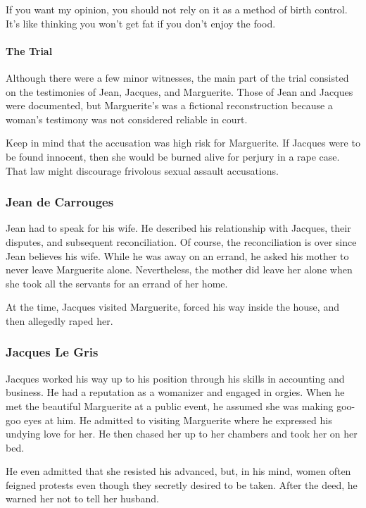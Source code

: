 If you want my opinion, you should not rely on it as a method of birth control. It's like thinking you won't get fat if you don't enjoy the food.

\paragraph{The Trial}


Although there were a few minor witnesses, the main part of the trial consisted on the testimonies of Jean, Jacques, and Marguerite. Those of Jean and Jacques were documented, but Marguerite's was a fictional reconstruction because a woman's testimony was not considered reliable in court.

Keep in mind that the accusation was high risk for Marguerite. If Jacques were to be found innocent, then she would be burned alive for perjury in a rape case. That law might discourage frivolous sexual assault accusations.

\subsubsection{Jean de Carrouges}


Jean had to speak for his wife. He described his relationship with Jacques, their disputes, and subsequent reconciliation. Of course, the reconciliation is over since Jean believes his wife. While he was away on an errand, he asked his mother to never leave Marguerite alone. Nevertheless, the mother did leave her alone when she took all the servants for an errand of her home.

At the time, Jacques visited Marguerite, forced his way inside the house, and then allegedly raped her.

\subsubsection{Jacques Le Gris}


Jacques worked his way up to his position through his skills in accounting and business. He had a reputation as a womanizer and engaged in orgies. When he met the beautiful Marguerite at a public event, he assumed she was making goo-goo eyes at him. He admitted to visiting Marguerite where he expressed his undying love for her. He then chased her up to her chambers and took her on her bed.

He even admitted that she resisted his advanced, but, in his mind, women often feigned protests even though they secretly desired to be taken. After the deed, he warned her not to tell her husband.

